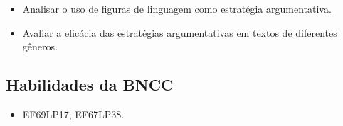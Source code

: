 \begin{itemize}
  
  \item Analisar o uso de figuras de linguagem como estratégia argumentativa.

  \item Avaliar a eficácia das estratégias argumentativas em textos de diferentes gêneros.

\end{itemize}

\subsection{Habilidades da BNCC}

\begin{itemize}

  \item EF69LP17, EF67LP38.

\end{itemize}


